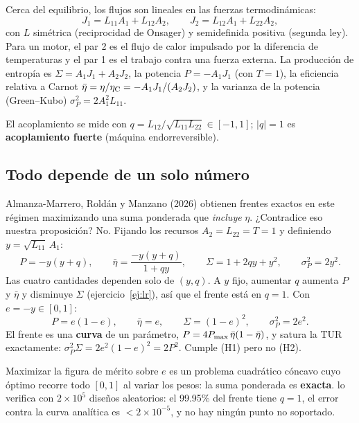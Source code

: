 Cerca del equilibrio, los flujos son lineales en las fuerzas termodinámicas:
\begin{equation}
J_1 = L_{11}A_1 + L_{12}A_2,\qquad J_2 = L_{12}A_1 + L_{22}A_2 ,
\end{equation}
con $L$ simétrica (reciprocidad de Onsager) y semidefinida positiva (segunda ley). Para un motor, el
par 2 es el flujo de calor impulsado por la diferencia de temperaturas y el par 1 es el trabajo
contra una fuerza externa. La producción de entropía es $\Sigma = A_1J_1 + A_2J_2$, la potencia
$P = -A_1J_1$ (con $T=1$), la eficiencia relativa a Carnot $\bar\eta = \eta/\eta_{\mathrm{C}} = -A_1J_1/(A_2J_2)$,
y la varianza de la potencia (Green--Kubo) $\sigma_P^2 = 2A_1^2L_{11}$.

El acoplamiento se mide con $q = L_{12}/\sqrt{L_{11}L_{22}}\in[-1,1]$; $|q| = 1$ es
\textbf{acoplamiento fuerte} (máquina endorreversible).

\subsection{Todo depende de un solo número}

Almanza-Marrero, Roldán y Manzano (2026) obtienen frentes exactos en este régimen maximizando una suma
ponderada que \emph{incluye} $\eta$. ¿Contradice eso nuestra proposición? No. Fijando los recursos
$A_2 = L_{22} = T = 1$ y definiendo $y = \sqrt{L_{11}}\,A_1$:
\begin{equation}
P = -y(y+q),\qquad \bar\eta = \frac{-y(y+q)}{1+qy},\qquad \Sigma = 1 + 2qy + y^2,\qquad \sigma_P^2 = 2y^2 .
\end{equation}
Las cuatro cantidades dependen solo de $(y,q)$. A $y$ fijo, aumentar $q$ aumenta $P$ y $\bar\eta$ y
disminuye $\Sigma$ (ejercicio~\ref{ej:lr}), así que el frente está en $q = 1$. Con $e = -y\in[0,1]$:
\begin{equation}
P = e(1-e),\qquad \bar\eta = e,\qquad \Sigma = (1-e)^2,\qquad \sigma_P^2 = 2e^2 .
\end{equation}
El frente es una \textbf{curva} de un parámetro, $P = 4P_{\max}\,\bar\eta(1-\bar\eta)$, y satura la TUR
exactamente: $\sigma_P^2\Sigma = 2e^2(1-e)^2 = 2P^2$. Cumple (H1) pero no (H2).

Maximizar la figura de mérito sobre $e$ es un problema cuadrático cóncavo cuyo óptimo recorre todo
$[0,1]$ al variar los pesos: la suma ponderada es \textbf{exacta}.  lo
verifica con $2\times10^5$ diseños aleatorios: el 99.95\% del frente tiene $q = 1$, el error contra
la curva analítica es $<2\times10^{-5}$, y no hay ningún punto no soportado.

